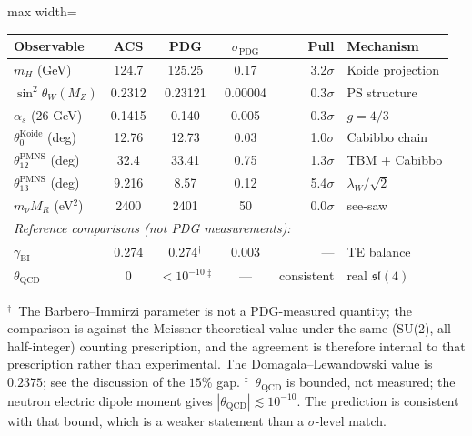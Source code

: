 \documentclass[11pt,a4paper]{article}
\theoremstyle{plain}
\theoremstyle{definition}
\theoremstyle{remark}
\begin{document}
\begin{center}
\begin{adjustbox}{max width=\linewidth}\begin{tabular}{lcccrl}
\toprule
Observable & ACS & PDG & $\sigma_{\mathrm{PDG}}$ & Pull & Mechanism \\
\midrule
$m_H$ (GeV)                  & 124.7     & 125.25     & 0.17     & 3.2$\sigma$ & Koide projection \\
$\sin^2\theta_W(M_Z)$        & 0.2312    & 0.23121    & 0.00004  & 0.3$\sigma$ & PS structure \\
$\alpha_s$ (26 GeV)           & 0.1415    & 0.140      & 0.005    & 0.3$\sigma$ & $g = 4/3$ \\
$\theta_0^{\mathrm{Koide}}$ (deg) & 12.76 & 12.73     & 0.03     & 1.0$\sigma$ & Cabibbo chain \\
$\theta_{12}^{\mathrm{PMNS}}$ (deg) & 32.4 & 33.41   & 0.75     & 1.3$\sigma$ & TBM + Cabibbo \\
$\theta_{13}^{\mathrm{PMNS}}$ (deg) & 9.216 & 8.57   & 0.12     & 5.4$\sigma$ & $\lambda_W/\sqrt{2}$ \\
$m_\nu M_R$ (eV$^2$)         & 2400      & 2401       & 50       & 0.0$\sigma$ & see-saw \\
\midrule
\multicolumn{6}{l}{\footnotesize\itshape Reference comparisons (not PDG measurements):} \\
$\gamma_{\mathrm{BI}}$       & 0.274     & 0.274$^{\dagger}$ & 0.003 & --- & TE balance \\
$\theta_{\mathrm{QCD}}$      & 0         & $<10^{-10}\,^{\ddagger}$ & --- & consistent & real $\mathfrak{sl}(4)$ \\
\bottomrule
\end{tabular}\end{adjustbox}
\end{center}

\noindent
$^{\dagger}$~The Barbero--Immirzi parameter is not a PDG-measured quantity; the
comparison is against the Meissner theoretical value under the same (SU(2),
all-half-integer) counting prescription, and the agreement is therefore
internal to that prescription rather than experimental.  The
Domagala--Lewandowski value is $0.2375$; see the discussion of the $15\%$ gap.
$^{\ddagger}$~$\theta_{\mathrm{QCD}}$ is bounded, not measured; the neutron
electric dipole moment gives $|\theta_{\mathrm{QCD}}| \lesssim 10^{-10}$.  The
prediction is consistent with that bound, which is a weaker statement than a
$\sigma$-level match.
\end{document}
